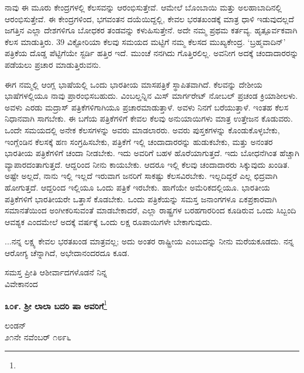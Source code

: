 ನಾವು ಈ ಮೂರು ಕೇಂದ್ರಗಳಲ್ಲಿ ಕೆಲಸವನ್ನು ಆರಂಭಿಸುತ್ತೇವೆ. ಆಮೇಲೆ ಬೊಂಬಾಯಿ ಮತ್ತು ಅಲಹಾಬಾದಿನಲ್ಲಿ ಆರಂಭಿಸುತ್ತೇವೆ. ಈ ಕೇಂದ್ರಗಳಿಂದ, ಭಗವಂತನ ದಯೆಯಿದ್ದಲ್ಲಿ, ಕೇವಲ ಭರತಖಂಡಕ್ಕೆ ಮಾತ್ರ ಧಾಳಿ ಇಡುವುದಲ್ಲದೆ ಜಗತ್ತಿನ ಎಲ್ಲಾ ದೇಶಗಳಿಗೂ ಬೋಧಕರ ತಂಡವನ್ನು ಕಳುಹಿಸುತ್ತೇನೆ. ಅದೇ ನಮ್ಮ ಪ್ರಥಮ ಕರ್ತವ್ಯ. ಹೃತ್ಪೂರ್ವಕವಾಗಿ ಕೆಲಸ ಮಾಡುತ್ತಿರು. 39 ವಿಕ್ಟೋರಿಯಾ ಕೆಲವು ಸಮಯದ ಮಟ್ಟಿಗೆ ನಮ್ಮ ಕೆಲಸದ ಮುಖ್ಯಕೇಂದ್ರ. ‘ಬ್ರಹ್ಮವಾದಿನ್’ ಪತ್ರಿಕೆಯ ದೊಡ್ಡ ಪೆಟ್ಟಿಗೆಯೇ ಸ್ಟರ್ಡಿ ಹತ್ತಿರ ಇದೆ. ಮುಂಚೆ ನನಗಿದು ಗೊತ್ತಿರಲಿಲ್ಲ. ಅವನೀಗ ಅದಕ್ಕೆ ಚಂದಾದಾರರನ್ನು ಪಡೆಯಲು ಪ್ರಚಾರ ಮಾಡುತ್ತಿರುವನು.

ಈಗ ನಮ್ಮಲ್ಲಿ ಆಂಗ್ಲ ಭಾಷೆಯಲ್ಲಿ ಒಂದು ಭಾರತೀಯ ಮಾಸಪತ್ರಿಕೆ ಸ್ಥಾಪಿತವಾಗಿದೆ. ಕೆಲವನ್ನು ದೇಶೀಯ ಭಾಷೆಗಳಲ್ಲಿಯೂ ನಾವು ಪ್ರಾರಂಭಿಸಬಹುದು. ವಿಂಬಲ್ಡನ್ನಿನ ಮಿಸ್ ಮಾರ್ಗರೇಟ್ ನೋಬಲ್ ಪ್ರಚಂಡ ಕ್ರಿಯಾಶೀಲಳು. ಅವಳು ಎರಡು ಮದ್ರಾಸ್ ಪತ್ರಿಕೆಗಳಿಗಾಗಿಯೂ ಪ್ರಚಾರಮಾಡುತ್ತಾಳೆ. ಅವಳು ನಿನಗೆ ಬರೆಯುತ್ತಾಳೆ. ಇಂತಹ ಕೆಲಸ ನಿಧಾನವಾಗಿ ಸಾಗಬೇಕು. ಈ ಬಗೆಯ ಪತ್ರಿಕೆಗಳಿಗೆ ಕೇವಲ ಕೆಲವು ಅನುಯಾಯಿಗಳು ಮಾತ್ರ ಉತ್ತೇಜನ ಕೊಡುವರು. ಒಂದೇ ಸಮಯದಲ್ಲಿ ಅನೇಕ ಕೆಲಸಗಳನ್ನು ಅವರು ಮಾಡಲಾರರು. ಅವರು ಪುಸ್ತಕಗಳನ್ನು ಕೊಂಡುಕೊಳ್ಳಬೇಕು, ಇಂಗ್ಲೆಂಡಿನ ಕೆಲಸಕ್ಕೆ ಹಣ ಸಂಗ್ರಹಿಸಬೇಕು, ಪತ್ರಿಕೆಗೆ ಇಲ್ಲಿ ಚಂದಾದಾರರನ್ನು ಹುಡುಕಬೇಕು, ಮತ್ತು ಅನಂತರ ಭಾರತೀಯ ಪತ್ರಿಕೆಗಳಿಗೆ ಚಂದಾ ನೀಡಬೇಕು. ಇದು ಅವರಿಗೆ ಬಹಳ ಹೊರೆಯಾಗುತ್ತದೆ. ಇದು ಬೋಧನೆಗಿಂತ ಹೆಚ್ಚಾಗಿ ವ್ಯಾಪಾರದಂತಾಗುತ್ತದೆ. ಆದ್ದರಿಂದ ನೀನು ಕಾಯಬೇಕು. ಆದರೂ ಇಲ್ಲಿ ಕೆಲವು ಚಂದಾದಾರರು ಸಿಕ್ಕುವುದು ಖಂಡಿತ. ಅಷ್ಟೇ ಅಲ್ಲದೆ, ನಾನು ಇಲ್ಲಿ ಇಲ್ಲದೆ ಇರುವಾಗ ಜನರಿಗೆ ಸಾಕಷ್ಟು ಕೆಲಸವಿರಬೇಕು. ಇಲ್ಲದಿದ್ದರೆ ಎಲ್ಲ ಛಿದ್ರವಾಗಿ ಹೋಗುತ್ತದೆ. ಆದ್ದರಿಂದ ಇಲ್ಲಿಯೂ ಒಂದು ಪತ್ರಿಕೆ ಇರಬೇಕು. ಹಾಗೆಯೇ ಅಮೆರಿಕದಲ್ಲಿಯೂ. ಭಾರತೀಯ ಪತ್ರಿಕೆಗಳಿಗೆ ಭಾರತೀಯರೇ ಒತ್ತಾಸೆ ಕೊಡಬೇಕು. ಒಂದು ಪತ್ರಿಕೆಯನ್ನು ಸಮಸ್ತ ಜನಾಂಗಗಳೂ ಏಕಪ್ರಕಾರವಾಗಿ ಸಮಾನತೆಯಿಂದ ಅಂಗೀಕರಿಸುವಂತೆ ಮಾಡಬೇಕಾದರೆ, ಎಲ್ಲಾ ರಾಷ್ಟ್ರಗಳ ಬರಹಗಾರರಿಂದ ಕೂಡಿರುವ ಒಂದು ಸಿಬ್ಬಂದಿ ಆವಶ್ಯಕ ಎಂದಮೇಲೆ ಅದಕ್ಕೆ ವರ್ಷಕ್ಕೆ ಒಂದು ಲಕ್ಷ ರೂಪಾಯಿಗಳೇ ಬೇಕಾಗುವುದು.

...ನನ್ನ ಲಕ್ಷ್ಯ ಕೇವಲ ಭರತಖಂಡ ಮಾತ್ರವಲ್ಲ; ಅದು ಅಂತರ ರಾಷ್ಟ್ರೀಯ ಎಂಬುದನ್ನು ನೀನು ಮರೆಯಕೂಡದು. ನನ್ನ ಆರೋಗ್ಯ ಚೆನ್ನಾಗಿದೆ, ಅಭೇದಾನಂದರದೂ ಕೂಡ.
\vspace{-0.4cm}

{\flushright
ಸಮಸ್ತ ಪ್ರೀತಿ ಆಶೀರ್ವಾದಗಳೊಡನೆ ನಿನ್ನ\\ವಿವೇಕಾನಂದ\par}
\vspace{-0.3cm}

\begin{center}
\textbf{೩೦೯. ಶ‍್ರೀ ಲಾಲಾ ಬದರಿ ಷಾ ಅವರಿಗೆ}\footnote{}
\end{center}
\vspace{-0.4cm}

\begin{flushright}
ಲಂಡನ್\\೨೧ನೇ ನವೆಂಬರ್ ೧೮೯೬
\end{flushright}
\vspace{-0.3cm}

